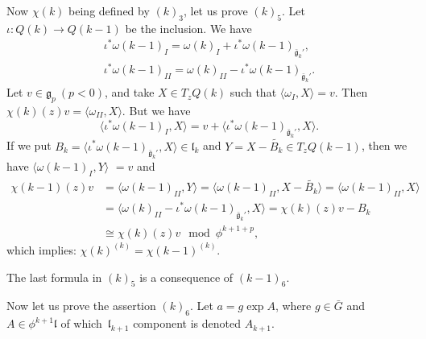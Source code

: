 \documentclass[10pt,a4paper]{amsart}
\newcommand{\gebar}{\bar{\mathfrak g}}
\newcommand{\g}{\mathfrak g}
\newcommand{\lf}{\mathfrak l}
\numberwithin{equation}{section}
\begin{document}
Now $\chi(k)$ being defined by $(k)_3$, let us prove $(k)_5$.
Let $\iota\colon Q(k) \to Q(k-1)$ be the inclusion. We have
\begin{gather*}
	\iota^* \omega(k-1)_I = \omega(k) _I + \iota ^* \omega(k-1) _{\gebar_k '}, \\
	\iota^* \omega(k-1)_{II} = \omega(k) _{II} - \iota ^* \omega(k-1) _{\gebar_k '}.
\end{gather*}
Let $v \in \g_p \ ( p < 0 ) $, and take $X \in T_zQ(k)$ such that
$ \langle \omega_I , X \rangle = v $.
Then $\chi(k) (z) v = \langle \omega_{II} , X\rangle$.
But we have
\[
\big\langle \iota^* \omega(k-1)_I, X \big\rangle = v + \big\langle \iota ^* \omega(k-1) _{\gebar_k '} , X\big\rangle.
\]
If we put
$B_k = \langle \iota ^* \omega(k-1) _{\gebar_k '} , X\rangle \in \lf_k$
and $ Y= X - \tilde{B_k} \in T_zQ(k-1)$, then we have
$\langle \omega(k-1)_I, Y\rangle$ $= v $ and
\begin{align*}
\chi(k-1)(z) v &=\big\langle \omega(k-1) _{II} , Y \big\rangle
= \big\langle \omega(k-1) _{II} , X - \tilde{B_k} \big\rangle
= \big\langle \omega(k-1) _{II} , X \big\rangle
\\
& = \big\langle \omega(k) _{II} - \iota ^* \omega(k-1) _{\gebar_k '} , X\big\rangle
= \chi(k)(z)v - B_k \\
&\cong \chi(k)(z)v \mod \phi^{k+1+p },
\end{align*}
which implies: $ \chi(k) ^{(k)} = \chi(k-1)^{(k)}$.

The last formula in $(k)_5$ is a consequence of $(k-1)_6$.

Now let us prove the assertion $(k)_6$.
Let $ a = g\exp A $, where $g \in \bar{G} $ and
$A \in \phi^{k+1} \lf$ of which~$\lf_{k+1}$ component
is denoted $A_{k+1}$.
\end{document}
